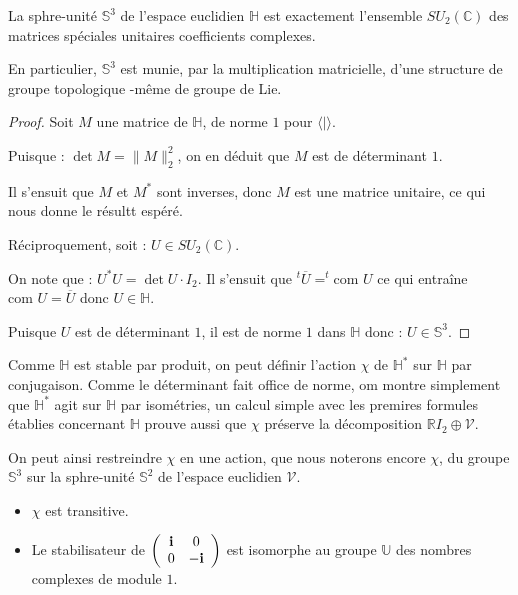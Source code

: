 \begin{prop}
La sphre-unit\'e $\mathbb{S}^3$ de l'espace euclidien $\mathbb{H}$ est exactement l'ensemble $SU_2(\mathbb{C})$ des matrices sp\'eciales unitaires  coefficients complexes.
\par
En particulier, $\mathbb{S}^3$ est munie, par la multiplication matricielle, d'une structure de groupe topologique -m\^eme de groupe de Lie.
\end{prop}

\begin{proof}
Soit $M$ une matrice de $\mathbb{H}$, de norme $1$ pour $\langle | \rangle$.
\par
Puisque : $\det M=\|M\|_2^2$, on en d\'eduit que $M$ est de d\'eterminant $1$.
\par
Il s'ensuit que $M$ et $M^{\ast}$ sont inverses, donc $M$ est une matrice unitaire, ce qui nous donne le r\'esultt esp\'er\'e.
\par
R\'eciproquement, soit : $U\in SU_2(\mathbb{C})$.
\par
On note que : $U^{\ast}U=\det U\cdot I_2$. Il s'ensuit que $^t\overline{U}=^t\text{com }U$ ce qui entra\^ine $\text{com }U=\overline{U}$ donc $U\in\mathbb{H}$.
\par
Puisque $U$ est de d\'eterminant $1$, il est de norme $1$ dans $\mathbb{H}$ donc : $U\in\mathbb{S}^3$.
\end{proof}

Comme $\mathbb{H}$ est stable par produit, on peut d\'efinir l'action $\chi$ de $\mathbb{H}^{\ast}$ sur $\mathbb{H}$ par conjugaison. %
Comme le d\'eterminant fait office de norme, om montre simplement que $\mathbb{H}^{\ast}$ agit sur $\mathbb{H}$ par isom\'etries, %
un calcul simple avec les premires formules \'etablies concernant $\mathbb{H}$ prouve aussi que $\chi$ pr\'eserve la d\'ecomposition $\mathbb{R}I_2\oplus\mathcal{V}$.
\par
On peut ainsi restreindre $\chi$ en une action, que nous noterons encore $\chi$, du groupe $\mathbb{S}^3$ sur la sphre-unit\'e $\mathbb{S}^2$ de l'espace euclidien $\mathcal{V}$.

\begin{prop}
\begin{itemize}
\item $\chi$ est transitive.
\item Le stabilisateur de $\left(\begin{array}{cc}\mathbf{i}&0\\0&-\mathbf{i}\end{array}\right)$ est isomorphe au groupe $\mathbb{U}$ des nombres complexes de module $1$.
\end{itemize}
\end{prop}

